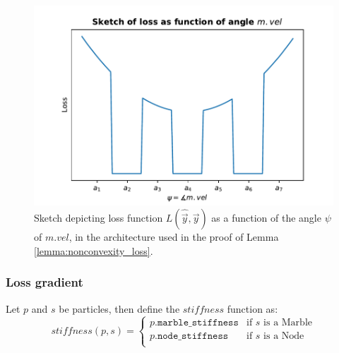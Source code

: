 \begin{figure}
    \centering
    \includegraphics{plot_nonconvex_loss.pdf}
    \caption{Sketch depicting loss function $L(\hat{\vec{y}}, \vec{y})$ as a function of the angle $\psi$ of $m.vel$, in the architecture used in the proof of Lemma \ref{lemma:nonconvexity_loss}.}
    \label{fig:nonconvexity_loss_plot}
\end{figure}

\clearpage

\subsubsection{Loss gradient}


Let $p$ and $s$ be particles, then define the $stiffness$ function as:
\begin{equation}
    stiffness(p, s) = 
    \begin{cases}
        p.\texttt{marble\_stiffness} &\text{if $s$ is a Marble} \\
        p.\texttt{node\_stiffness} &\text{if $s$ is a Node} \\
    \end{cases}
\end{equation}



